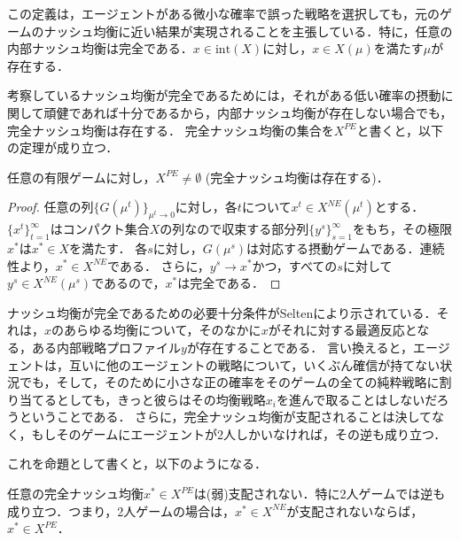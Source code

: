\documentclass{jsreport}
\begin{document}
この定義は，エージェントがある微小な確率で誤った戦略を選択しても，元のゲームのナッシュ均衡に近い結果が実現されることを主張している．特に，任意の内部ナッシュ均衡は完全である．$x \in \mbox{int}(X)$に対し，$x \in X(\mu)$を満たす$\mu$が存在する．

考察しているナッシュ均衡が完全であるためには，それがある低い確率の摂動に関して頑健であれば十分であるから，内部ナッシュ均衡が存在しない場合でも，完全ナッシュ均衡は存在する．
完全ナッシュ均衡の集合を$X^{PE}$と書くと，以下の定理が成り立つ．

\begin{screen}
  \begin{theo}
    任意の有限ゲームに対し，$X^{PE} \neq \emptyset$ (完全ナッシュ均衡は存在する)．
  \end{theo}
\end{screen}
\begin{proof}
  任意の列$\{G(\mu^t)\}_{\mu^t \to 0}$に対し，各$t$について$x^t \in X^{NE}(\mu^t)$とする．
  $\{x^t\}_{t = 1}^{\infty}$はコンパクト集合$X$の列なので収束する部分列$\{y^s\}_{s = 1}^{\infty}$をもち，その極限$x^{*}$は$x^{*} \in X$を満たす．
  各$s$に対し，$G(\mu^s)$は対応する摂動ゲームである．連続性より，$x^{*} \in X^{NE}$である．
  さらに，$y^s \to x^{*}$かつ，すべての$s$に対して$y^s \in X^{NE}(\mu^s)$であるので，$x^{*}$は完全である．
\end{proof}

ナッシュ均衡が完全であるための必要十分条件がSeltenにより示されている．それは，$x$のあらゆる均衡について，そのなかに$x$がそれに対する最適反応となる，ある内部戦略プロファイル$y$が存在することである．
言い換えると，エージェントは，互いに他のエージェントの戦略について，いくぶん確信が持てない状況でも，そして，そのために小さな正の確率をそのゲームの全ての純粋戦略に割り当てるとしても，きっと彼らはその均衡戦略$x_i$を進んで取ることはしないだろうということである．
さらに，完全ナッシュ均衡が支配されることは決してなく，もしそのゲームにエージェントが2人しかいなければ，その逆も成り立つ．

これを命題として書くと，以下のようになる．
\begin{screen}
  \begin{prop}\label{prop:1}
    任意の完全ナッシュ均衡$x^{*} \in X^{PE}$は(弱)支配されない．特に2人ゲームでは逆も成り立つ．つまり，2人ゲームの場合は，$x^{*} \in X^{NE}$が支配されないならば，$x^{*} \in X^{PE}$．
  \end{prop}
\end{screen}
\end{document}
